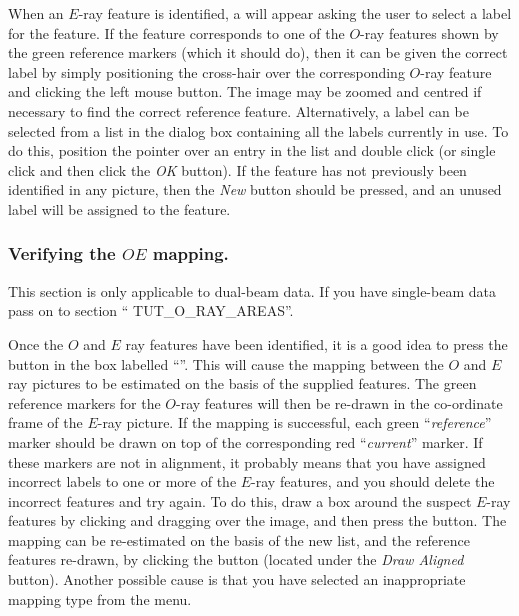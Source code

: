 \documentclass[11pt,nolof]{starlink}
\begin{document}
When an $E$-ray feature is identified, a  will appear asking the user to select a label for
the feature. If the feature corresponds to one of the $O$-ray features
shown by the green reference markers (which it should do), then it can be
given the correct label by simply positioning the cross-hair over the
corresponding $O$-ray feature and clicking the left mouse button. The
image may be zoomed and centred if necessary to find the correct
reference feature. Alternatively, a label can be selected from a list in
the dialog box containing all the labels currently in use. To do this,
position the pointer over an entry in the list and double click (or
single click and then click the \emph{OK} button). If the feature has not
previously been identified in any picture, then the \emph{New} button
should be pressed, and an unused label will be assigned to the feature.

\subsubsection {Verifying the $OE$ mapping.}
This section is only applicable to dual-beam data. If you have
single-beam data pass on to section ``
{TUT_O_RAY_AREAS}''.

Once the $O$ and $E$ ray features have been identified, it is a good idea
to press the  button in
the box labelled ``''. This
will cause the mapping between the $O$ and $E$ ray pictures to be
estimated on the basis of the supplied features. The green reference
markers for the $O$-ray features will then be re-drawn in the co-ordinate
frame of the $E$-ray picture. If the mapping is successful, each green
``\emph{reference}'' marker should be drawn on top of the corresponding
red ``\emph{current}'' marker. If these markers are not in alignment, it
probably means that you have assigned incorrect labels to one or more of
the $E$-ray features, and you should delete the incorrect features and
try again. To do this, draw a box around the suspect $E$-ray features by
clicking and dragging over the image, and then press the  button. The mapping can be re-estimated on the
basis of the new list, and the reference features re-drawn, by clicking
the  button (located under the \emph{Draw Aligned} button). Another possible cause is that you have selected
an inappropriate mapping type from the  menu.
\end{document}
